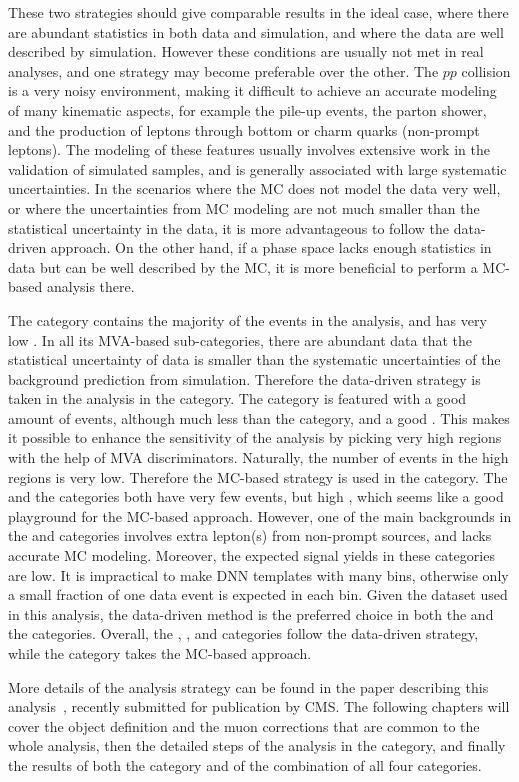 These two strategies should give comparable results in the ideal case, where there are abundant statistics in both data and simulation,
and where the data are well described by simulation.
However these conditions are usually not met in real analyses, and one strategy may become preferable over the other.
The $pp$ collision is a very noisy environment, making it difficult to achieve an accurate modeling of many kinematic aspects,
for example the pile-up events, the parton shower, and the production of leptons through bottom or charm quarks (non-prompt leptons).
The modeling of these features usually involves extensive work in the validation of simulated samples, and is generally associated with large systematic uncertainties.
In the scenarios where the MC does not model the data very well, or where the uncertainties from MC modeling are not much smaller than the statistical uncertainty in the data,
it is more advantageous to follow the data-driven approach.
On the other hand, if a phase space lacks enough statistics in data but can be well described by the MC, 
it is more beneficial to perform a MC-based analysis there.

The \ggH category contains the majority of the events in the \hmm analysis, and has very low \SoB. 
In all its MVA-based sub-categories, there are abundant data that the statistical uncertainty of data is smaller than the systematic uncertainties of the background prediction from simulation.
Therefore the data-driven strategy is taken in the analysis in the \ggH category.
The \qqH category is featured with a good amount of events, although much less than the \ggH category, and a good \SoB.
This makes it possible to enhance the sensitivity of the analysis by picking very high \SoB regions with the help of MVA discriminators. 
Naturally, the number of events in the high \SoB regions is very low. Therefore the MC-based strategy is used in the \qqH category.
The \VH and the \ttH categories both have very few events, but high \SoB, which seems like a good playground for the MC-based approach.
However, one of the main backgrounds in the \VH and \ttH categories involves extra lepton(s) from non-prompt sources, and lacks accurate MC modeling.
Moreover, the expected signal yields in these categories are low. 
It is impractical to make DNN templates with many bins, 
otherwise only a small fraction of one data event is expected in each bin.
Given the dataset used in this analysis, the data-driven method is the preferred choice in both the \VH and the \ttH categories.
Overall, the \ggH, \VH, and \ttH categories follow the data-driven strategy, while the \qqH category takes the MC-based approach.

More details of the analysis strategy can be found in the paper describing this analysis~\cite{cmscollaboration2020evidence}, recently submitted for publication by CMS. 
The following chapters will cover the object definition and the muon corrections that are common to the whole analysis, 
then the detailed steps of the analysis in the \VH category, 
and finally the results of both the \VH category and of the combination of all four categories.
